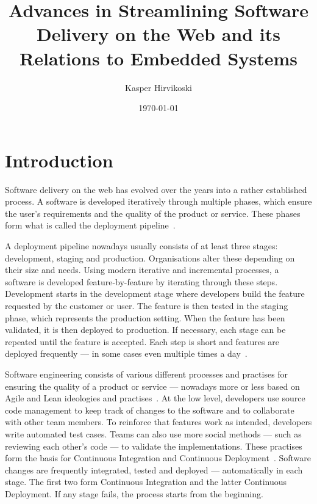 \documentclass[english]{tktltiki2}
\title{Advances in Streamlining Software Delivery on the Web and its Relations to Embedded Systems}
\author{Kasper Hirvikoski}
\date{\today}
\begin{document}

\frontmatter

\maketitle
\setcounter{page}{2}
\makeabstract

\tableofcontents


\mainmatter


\section{Introduction}

Software delivery on the web has evolved over the years into a rather established process. A software is developed iteratively through multiple phases, which ensure the user’s requirements and the quality of the product or service. These phases form what is called the deployment pipeline~\cite{Fow06, HF11, Fow13a, Fow13b}.

A deployment pipeline nowadays usually consists of at least three stages: development, staging and production. Organisations alter these depending on their size and needs. Using modern iterative and incremental processes, a software is developed feature-by-feature by iterating through these steps. Development starts in the development stage where developers build the feature requested by the customer or user. The feature is then tested in the staging phase, which represents the production setting. When the feature has been validated, it is then deployed to production. If necessary, each stage can be repeated until the feature is accepted. Each step is short and features are deployed frequently — in some cases even multiple times a day~\cite{OR11, Sny13, Rub14}.

Software engineering consists of various different processes and practises for ensuring the quality of a product or service — nowadays more or less based on Agile and Lean ideologies and practises~\cite{Ono88, BBB01a, Fow05, Mon12}. At the low level, developers use source code management to keep track of changes to the software and to collaborate with other team members. To reinforce that features work as intended, developers write automated test cases. Teams can also use more social methods — such as reviewing each other’s code — to validate the implementations. These practises form the basis for Continuous Integration and Continuous Deployment~\cite{Fow06, HF11, Fow13a, Fow13b}. Software changes are frequently integrated, tested and deployed — automatically in each stage. The first two form Continuous Integration and the latter Continuous Deployment. If any stage fails, the process starts from the beginning.
\end{document}
